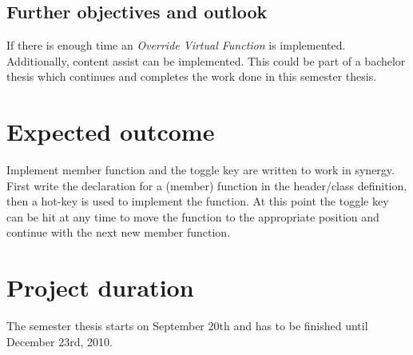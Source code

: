 \subsection{Further objectives and outlook}

If there is enough time an \textit{Override Virtual Function} is implemented.
Additionally, content assist can be implemented. This could be part of a
bachelor thesis which continues and completes the work done in this semester
thesis.

\section{Expected outcome}

Implement member function and the toggle key are written to work in synergy.
First write the declaration for a (member) function in the header/class
definition, then a hot-key is used to implement the function. At this point the
toggle key can be hit at any time to move the function to the appropriate
position and continue with the next new member function.

\section{Project duration}
The semester thesis starts on September 20th and has to be finished until
December 23rd, 2010.

